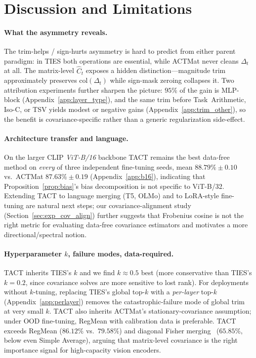 \documentclass{article}
\theoremstyle{plain}
\theoremstyle{definition}
\theoremstyle{remark}
\begin{document}
\section{Discussion and Limitations}
\label{sec:discussion}

\paragraph{What the asymmetry reveals.} The trim-helps / sign-hurts asymmetry is hard to predict from either parent paradigm: in TIES both operations are essential, while ACTMat never cleans $\Delta_t$ at all. The matrix-level $\hat{C}_t$ exposes a hidden distinction---magnitude trim approximately preserves $\mathrm{col}(\Delta_t)$ while sign-mask zeroing collapses it. Two attribution experiments further sharpen the picture: $95\%$ of the gain is MLP-block (Appendix~\ref{app:layer_type}), and the same trim before Task~Arithmetic, Iso-C, or TSV yields modest or negative gains (Appendix~\ref{app:trim_other}), so the benefit is covariance-specific rather than a generic regularization side-effect.

\paragraph{Architecture transfer and language.} On the larger CLIP \emph{ViT-B/16} backbone TACT remains the best data-free method on \emph{every} of three independent fine-tuning seeds, mean $88.79\% \pm 0.10$ vs.\ ACTMat $87.63\% \pm 0.19$ (Appendix~\ref{app:b16}), indicating that Proposition~\ref{prop:bias}'s bias decomposition is not specific to ViT-B/32. Extending TACT to language merging (T5, OLMo) and to LoRA-style fine-tuning are natural next steps; our covariance-alignment study (Section~\ref{sec:exp_cov_align}) further suggests that Frobenius cosine is not the right metric for evaluating data-free covariance estimators and motivates a more directional/spectral notion.

\paragraph{Hyperparameter $k$, failure modes, data-required.} TACT inherits TIES's $k$ and we find $k\approx 0.5$ best (more conservative than TIES's $k=0.2$, since covariance solves are more sensitive to lost rank). For deployments without $k$-tuning, replacing TIES's global top-$k$ with a \emph{per-layer} top-$k$ (Appendix~\ref{app:perlayer}) removes the catastrophic-failure mode of global trim at very small $k$. TACT also inherits ACTMat's stationary-covariance assumption; under OOD fine-tuning, RegMean with calibration data is preferable. TACT exceeds RegMean ($86.12\%$ vs.\ $79.58\%$) and diagonal Fisher merging~\citep{matena2022merging} ($65.85\%$, below even Simple Average), arguing that matrix-level covariance is the right importance signal for high-capacity vision encoders.
\end{document}
